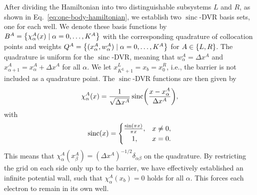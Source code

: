 \documentclass[twocolumn,superscriptaddress,unsortedaddress,
 amsmath,amssymb,
 aps,
]{revtex4-2}
\DeclareMathOperator{\sinc}{sinc}
\begin{document}
        After dividing the Hamiltonian into two distinguishable subsystems $L$ and $R$, as shown in Eq.~\eqref{eq:one-body-hamiltonian}, we establish two $\sinc$-DVR basis sets, one for each well.
        We denote these basis functions by $B^A = \qty{\chi^A_{\alpha}(x) \mid \alpha = 0, \dots, K^A}$ with the corresponding quadrature of collocation points and weights $Q^A = \qty{(x^A_{\alpha}, w^A_{\alpha}) \mid \alpha = 0, \dots, K^A}$ for $A \in \qty{L, R}$.
        The quadrature is uniform for the $\sinc$-DVR, meaning that $w^A_{\alpha} = \Delta x^A$ and $x^A_{\alpha + 1} = x^A_{\alpha} + \Delta x^A$ for all $\alpha$.
        We let $x^L_{K^L + 1} = x_b = x^R_{0}$, i.e., the barrier is
        not included as a quadrature point.
        The $\sinc$-DVR functions are then given by
        \begin{align*}
            \chi^A_{\alpha}(x) = \frac{1}{\sqrt{\Delta x^A}}
            \sinc\!\qty(
                \frac{x - x^A_{\alpha}}{\Delta x^A}
            ),
        \end{align*}
        with
        \begin{align*}
            \sinc(x) = \begin{cases}
                \frac{\sin(\pi x)}{\pi x}, & x \neq 0, \\
                \hfil 1, & x = 0.
            \end{cases}
        \end{align*}
        This means that $\chi^A_{\alpha} (x^A_{\beta}) = (\Delta x^A)^{-1/2} \delta_{\alpha \beta}$ on the quadrature.
        By restricting the grid on each side only up to the barrier, we have effectively established an infinite potential wall, such that $\chi^A_{\alpha}(x_b) = 0$ holds for all $\alpha$.
        This forces each electron to remain in its own well.
\end{document}
